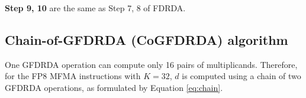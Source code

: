 \textbf{Step 9, 10} are the same as Step 7, 8 of FDRDA.

\subsection{Chain-of-GFDRDA (CoGFDRDA) algorithm}

One GFDRDA operation can compute only 16 pairs of multiplicands. Therefore, for the FP8 MFMA instructions with $K=32$, $d$ is computed using a chain of two GFDRDA operations, as formulated by Equation \ref{eq:chain}.